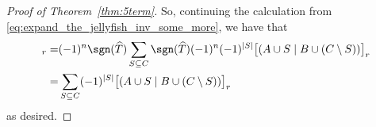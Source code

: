 \begin{proof}[Proof of Theorem~\ref{thm:5term}]
So, continuing the calculation from \eqref{eq:expand_the_jellyfish_inv_some_more}, we have that 
\begin{align*}
   [(A\cup B \ | \ C)]_r =& (-1)^n\sgn(\widehat{T})\sum_{S\subseteq C}\sgn(\widehat{T})(-1)^n(-1)^{|S|}\big[( A\cup S \mid B\cup (C\setminus S) ) \big]_r \\
    =& \sum_{S\subseteq C}(-1)^{|S|}\big[( A\cup S \mid B\cup (C\setminus S) ) \big]_r
\end{align*}
as desired.
\end{proof}
